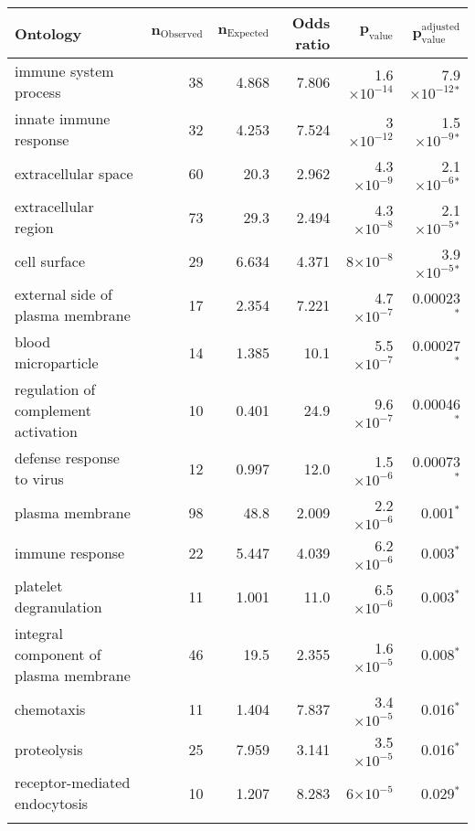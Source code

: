 \documentclass{article}
\begin{document}
\begin{table*}[!ht]
	\centering
	\begin{adjustbox}{width = 1\textwidth}
		\small
		\begin{tabular}{|l|r|r|r|r|r|}
			\toprule
			\textbf{Ontology} &
			$\bm{n_{\mathrm{Observed}}}$ &
			$\bm{n_{\mathrm{Expected}}}$ &
			\textbf{Odds ratio} &
			$\bm{p_{\mathrm{value}}}$ &
			$\bm{p_{\mathrm{value}}^{\mathrm{adjusted}}}$ \\
			\midrule
			immune system process & 38 & 4.868 & 7.806 & 1.6$\times 10^{-14}$ & 7.9$\times 10^{-12}$$\bm{^*}$ \\
			innate immune response & 32 & 4.253 & 7.524 & 3$\times 10^{-12}$ & 1.5$\times 10^{-9}$$\bm{^*}$ \\
			extracellular space & 60 & 20.3 & 2.962 & 4.3$\times 10^{-9}$ & 2.1$\times 10^{-6}$$\bm{^*}$ \\
			extracellular region & 73 & 29.3 & 2.494 & 4.3$\times 10^{-8}$ & 2.1$\times 10^{-5}$$\bm{^*}$ \\
			cell surface & 29 & 6.634 & 4.371 & 8$\times 10^{-8}$ & 3.9$\times 10^{-5}$$\bm{^*}$ \\
			external side of plasma membrane & 17 & 2.354 & 7.221 & 4.7$\times 10^{-7}$ & 0.00023$\bm{^*}$ \\
			blood microparticle & 14 & 1.385 & 10.1 & 5.5$\times 10^{-7}$ & 0.00027$\bm{^*}$ \\
			regulation of complement activation & 10 & 0.401 & 24.9 & 9.6$\times 10^{-7}$ & 0.00046$\bm{^*}$ \\
			defense response to virus & 12 & 0.997 & 12.0 & 1.5$\times 10^{-6}$ & 0.00073$\bm{^*}$ \\
			plasma membrane & 98 & 48.8 & 2.009 & 2.2$\times 10^{-6}$ & 0.001$\bm{^*}$ \\
			immune response & 22 & 5.447 & 4.039 & 6.2$\times 10^{-6}$ & 0.003$\bm{^*}$ \\
			platelet degranulation & 11 & 1.001 & 11.0 & 6.5$\times 10^{-6}$ & 0.003$\bm{^*}$ \\
			integral component of plasma membrane & 46 & 19.5 & 2.355 & 1.6$\times 10^{-5}$ & 0.008$\bm{^*}$ \\
			chemotaxis & 11 & 1.404 & 7.837 & 3.4$\times 10^{-5}$ & 0.016$\bm{^*}$ \\
			proteolysis & 25 & 7.959 & 3.141 & 3.5$\times 10^{-5}$ & 0.016$\bm{^*}$ \\
			receptor-mediated endocytosis & 10 & 1.207 & 8.283 & 6$\times 10^{-5}$ & 0.029$\bm{^*}$ \\
$$
\end{tabular}
\end{adjustbox}
\end{table*}
\end{document}
